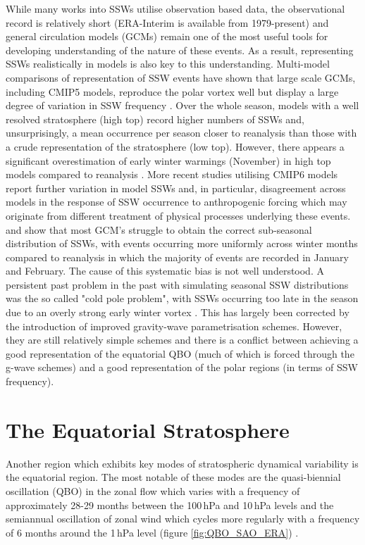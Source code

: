 While many works into SSWs utilise observation based data, the observational record is relatively short (ERA-Interim is available from 1979-present) and general circulation models (GCMs) remain one of the most useful tools for developing understanding of the nature of these events. As a result, representing SSWs realistically in models is also key to this understanding. Multi-model comparisons of representation of SSW events have shown that large scale GCMs, including CMIP5 models, reproduce the polar vortex well but display a large degree of variation in SSW frequency \citep{Butchart2011, Kim2017}. Over the whole season, models with a well resolved stratosphere (high top) record higher numbers of SSWs and, unsurprisingly, a mean occurrence per season closer to reanalysis than those with a crude representation of the stratosphere (low top). However, there appears a significant overestimation of early winter warmings (November) in high top models compared to reanalysis \citep{Kim2017}. More recent studies utilising CMIP6 models report further variation in model SSWs and, in particular, disagreement across models in the response of SSW occurrence to anthropogenic forcing \citep{ayarzaguenaUncertainty2020b} which may originate from different treatment of physical processes underlying these events. \cite{Charlton2007} and \cite{Schmidt2013} show that most GCM’s struggle to obtain the correct sub-seasonal distribution of SSWs, with events occurring more uniformly across winter months compared to reanalysis in which the majority of events are recorded in January and February. The cause of this systematic bias is not well understood. A persistent past problem in the past with simulating seasonal SSW distributions was the so called "cold pole problem", with SSWs occurring too late in the season due to an overly strong early winter vortex \citep{pawsoncharltonNew2007c,}. This has largely been corrected by the introduction of improved gravity-wave parametrisation schemes. However, they are still relatively simple schemes and there is a conflict between achieving a good representation of the equatorial QBO (much of which is forced through the g-wave schemes) and a good representation of the polar regions (in terms of SSW frequency). 

\section{The Equatorial Stratosphere}\label{sec:equatorial_strat}
Another region which exhibits key modes of stratospheric dynamical variability is the equatorial region. The most notable of these modes are the quasi-biennial oscillation (QBO) in the zonal flow which varies with a frequency of approximately 28-29 months between the 100\,hPa and 10\,hPa levels and the semiannual oscillation of zonal wind which cycles more regularly with a frequency of 6 months around the 1\,hPa level (figure \ref{fig:QBO_SAO_ERA}) \citep{Baldwin1991}.


